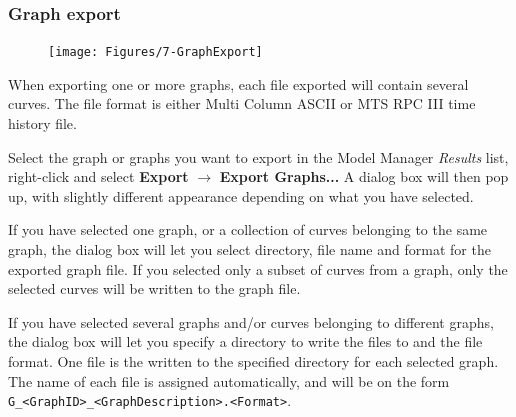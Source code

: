 \subsubsection{Graph export}

\begin{figure}
  \vspace{-10mm}
  \texttt{[image: Figures/7-GraphExport]}
\end{figure}

When exporting one or more graphs, each file exported will contain several
curves. The file format is either Multi Column ASCII or MTS RPC III
time history file.

Select the graph or graphs you want to export in the Model Manager
{\sl Results} list, right-click and select \textbf{Export} $\rightarrow$
\textbf{Export Graphs...} A dialog box will then pop up, with slightly
different appearance depending on what you have selected.

If you have selected one graph, or a collection of curves belonging to the same
graph, the dialog box will let you select directory, file name and format for
the exported graph file. If you selected only a subset of curves from a graph,
only the selected curves will be written to the graph file.

If you have selected several graphs and/or curves belonging to different
graphs, the dialog box will let you specify a directory to write the
files to and the file format. One file is the written to the specified
directory for each selected graph. The name of each file is assigned
automatically, and will be on the form
{\tt G\_\textless GraphID\textgreater\_\textless GraphDescription\textgreater.\textless Format\textgreater}.


